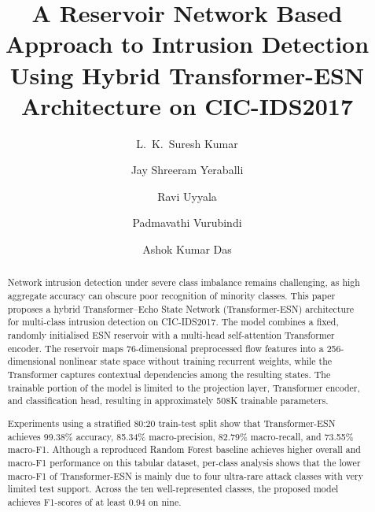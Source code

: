 \documentclass[5p,times]{elsarticle}
\begin{document}
	
	\begin{frontmatter}
		
		\title{A Reservoir Network Based Approach to Intrusion Detection
			Using Hybrid Transformer-ESN Architecture on CIC-IDS2017}
		
		\author[1]{L.~K.~Suresh Kumar}
		\author[1]{Jay Shreeram Yeraballi}
		\author[2]{Ravi Uyyala}
		\author[2]{Padmavathi Vurubindi}
		\author[3]{Ashok Kumar Das}
		
		
		
		
		\begin{abstract}
			
			Network intrusion detection under severe class imbalance remains challenging, as high aggregate accuracy can obscure poor recognition of minority classes. This paper proposes a hybrid Transformer--Echo State Network (Transformer-ESN) architecture for multi-class intrusion detection on CIC-IDS2017. The model combines a fixed, randomly initialised ESN reservoir with a multi-head self-attention Transformer encoder. The reservoir maps 76-dimensional preprocessed flow features into a 256-dimensional nonlinear state space without training recurrent weights, while the Transformer captures contextual dependencies among the resulting states. The trainable portion of the model is limited to the projection layer, Transformer encoder, and classification head, resulting in approximately 508K trainable parameters.
			
			Experiments using a stratified 80:20 train-test split show that Transformer-ESN achieves 99.38\% accuracy, 85.34\% macro-precision, 82.79\% macro-recall, and 73.55\% macro-F1. Although a reproduced Random Forest baseline achieves higher overall and macro-F1 performance on this tabular dataset, per-class analysis shows that the lower macro-F1 of Transformer-ESN is mainly due to four ultra-rare attack classes with very limited test support. Across the ten well-represented classes, the proposed model achieves F1-scores of at least 0.94 on nine.
			

\end{abstract}
\end{frontmatter}
\end{document}

